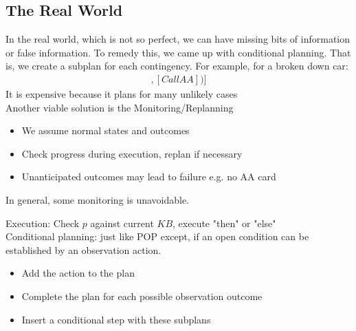 \documentclass[a4paper]{article}
\theoremstyle{plain}
\theoremstyle{definition}
\newtheorem{defn}{Definition}[section]
\theoremstyle{remark}
\begin{document}
\subsection{The Real World}
In the real world, which is not so perfect, we can have missing bits of information or false information. To remedy this, we came up with conditional planning. That is, we create a subplan for each contingency. For example, for a broken down car:\\
\begin{align*}
	[Check(Tire_1),If(Intact(Tire_1), [Inflate(Tire_1)],[CallAA])]
\end{align*}
It is expensive because it plans for many unlikely cases \\
Another viable solution is the Monitoring/Replanning
\begin{itemize}
	\item We assume normal states and outcomes
	\item Check progress during execution, replan if necessary
	\item Unanticipated outcomes may lead to failure e.g. no AA card
\end{itemize}
In general, some monitoring is unavoidable.
\begin{tcolorbox}[colback=black!3!white,colframe=black!60!white,title=\begin{defn}Conditional Planning \label{Conditional Planning}\end{defn}]
Execution: Check $p$ against current $KB$, execute "then" or "else"\\
Conditional planning: just like POP except, if an open condition can be established by an observation action.
\begin{itemize}
	\item Add the action to the plan
	\item Complete the plan for each possible observation outcome
	\item Insert a conditional step with these subplans
\end{itemize}
\end{tcolorbox}
\end{document}
